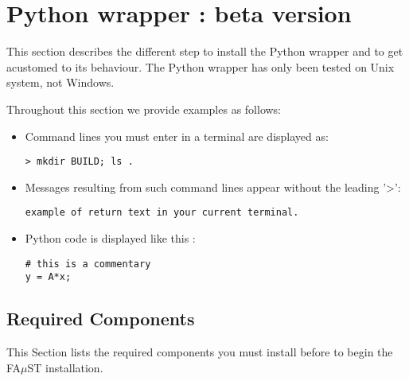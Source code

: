 \section{Python wrapper : beta version}\label{sec:Pythonwrapper}
This section describes the different step to install the Python wrapper and to get acustomed to its behaviour.
The Python wrapper has only been tested on Unix system, not Windows.

Throughout this section we provide examples as follows:
\begin{itemize}
\item Command lines you must enter in a terminal are displayed as:
\lstset{style=customBash}
\begin{lstlisting}
> mkdir BUILD; ls . 
\end{lstlisting}
\item Messages resulting from such command lines appear without the leading '>':
\lstset{style=customBash}
\begin{lstlisting}
example of return text in your current terminal. 
\end{lstlisting}
\item Python code is displayed like this :
\lstset{style=customPython}
\begin{lstlisting}
# this is a commentary
y = A*x; 
\end{lstlisting}
\end{itemize}

\subsection{Required Components}
This Section lists the required components you must install before to begin the FA$\mu$ST installation.

